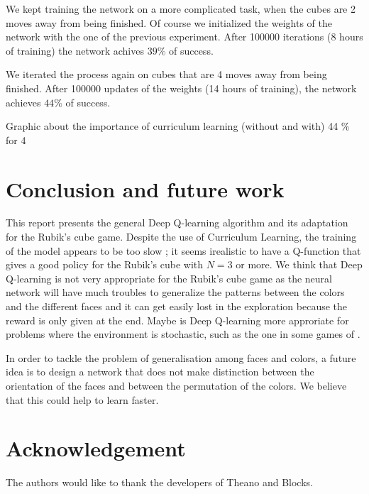 \documentclass{article} %
\begin{document}
We kept training the network on a more complicated task, when the cubes are 2 moves away from being  finished. Of course we initialized the weights of the network with the one of the previous experiment. After 100000 iterations (8 hours of training) the network achives $39$\% of success.

We iterated the process again on cubes that are 4 moves away from being finished. After 100000 updates of the weights (14 hours of training), the network achieves $44$\% of success.


Graphic about the importance of curriculum learning (without and with)
44 \% for 4

\section{Conclusion and future work}
This report presents the general Deep Q-learning algorithm and its adaptation for the Rubik's cube game. Despite the use of Curriculum Learning, the training of the model appears to be too slow ; it seems irealistic to have a Q-function that gives a good policy for the Rubik's cube with $N=3$ or more. We think that Deep Q-learning is not very appropriate for the Rubik's cube game as the neural network will have much troubles to generalize the patterns between the colors and the different faces and it can get easily lost in the exploration because the reward is only given at the end. Maybe is Deep Q-learning more approriate for problems where the environment is stochastic, such as the one in some games of \cite{deepmind}.

In order to tackle the problem of generalisation among faces and colors, a future idea is to design a network that does not make distinction between the orientation of the faces and between the permutation of the colors. We believe that this could help to learn faster.

\section{Acknowledgement}
The authors would like to thank the developers of Theano and Blocks.




\end{document}
